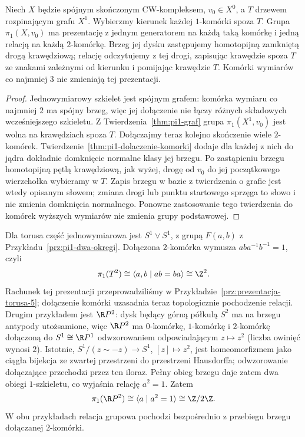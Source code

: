 \begin{wniosek}
\label{wn:pi1-cw-prezentacja}
Niech $X$ będzie spójnym skończonym CW-kompleksem,
$v_0\in X^0$, a $T$ drzewem rozpinającym grafu $X^1$.
Wybierzmy kierunek każdej $1$-komórki spoza $T$.
Grupa $\pi_1(X,v_0)$ ma prezentację z jednym generatorem
na każdą taką komórkę i jedną relacją na każdą
$2$-komórkę. Brzeg jej dysku zastępujemy homotopijną
zamkniętą drogą krawędziową; relację odczytujemy z tej
drogi, zapisując krawędzie spoza $T$ ze znakami zależnymi
od kierunku i pomijając krawędzie $T$. Komórki wymiarów
co najmniej $3$ nie zmieniają tej prezentacji.
\end{wniosek}
\begin{proof}
Jednowymiarowy szkielet jest spójnym grafem: komórka
wymiaru co najmniej $2$ ma spójny brzeg, więc jej
dołączenie nie łączy różnych składowych wcześniejszego
szkieletu. Z Twierdzenia~\ref{thm:pi1-graf} grupa
$\pi_1(X^1,v_0)$ jest wolna na krawędziach spoza $T$.
Dołączajmy teraz kolejno skończenie wiele $2$-komórek.
Twierdzenie~\ref{thm:pi1-dolaczenie-komorki} dodaje dla
każdej z nich do jądra dokładnie domknięcie normalne
klasy jej brzegu. Po zastąpieniu brzegu homotopijną
pętlą krawędziową, jak wyżej, drogę od $v_0$ do jej
początkowego wierzchołka wybieramy w $T$. Zapis brzegu
w bazie z twierdzenia o grafie jest wtedy opisanym słowem;
zmiana drogi lub punktu startowego sprzęga to słowo i
nie zmienia domknięcia normalnego. Ponowne zastosowanie
tego twierdzenia do komórek wyższych wymiarów
nie zmienia grupy podstawowej.
\end{proof}

\begin{przyklad}
\label{prz:pi1-torus-rp2}
Dla torusa część jednowymiarowa
jest $S^1\vee S^1$, z grupą
$F(a,b)$ z Przykładu~\ref{prz:pi1-dwa-okregi}.
Dołączona $2$-komórka wymusza
$aba^{-1}b^{-1}=1$, czyli
\[
 \pi_1(T^2)\cong
 \langle a,b\mid ab=ba\rangle
 \cong\Z^2.
\]
Rachunek tej prezentacji przeprowadziliśmy w
Przykładzie~\ref{prz:prezentacja-torusa-5}; dołączenie komórki
uzasadnia teraz topologicznie pochodzenie relacji.
Drugim przykładem jest
$\R P^2$: dysk będący górną
półkulą $S^2$ ma na brzegu
antypody utożsamione, więc
$\R P^2$ ma $0$-komórkę,
      $1$-komórkę i $2$-komórkę
      dołączoną do $S^1\cong\R P^1$
      odwzorowaniem odpowiadającym
      $z\mapsto z^2$ (liczba owinięć wynosi $2$).
      Istotnie, $S^1/(z\sim-z)\to S^1$, $[z]\mapsto z^2$,
      jest homeomorfizmem jako ciągła bijekcja ze zwartej
      przestrzeni do przestrzeni Hausdorffa; odwzorowanie dołączające
      przechodzi przez ten iloraz. Pełny obieg brzegu daje zatem dwa obiegi
      $1$-szkieletu, co wyjaśnia relację $a^2=1$.
      Zatem
\[
 \pi_1(\R P^2)
 \cong\langle a\mid a^2=1\rangle
 \cong\Z/2\Z.
\]
W obu przykładach relacja grupowa pochodzi bezpośrednio
z przebiegu brzegu dołączanej $2$-komórki.
\end{przyklad}

